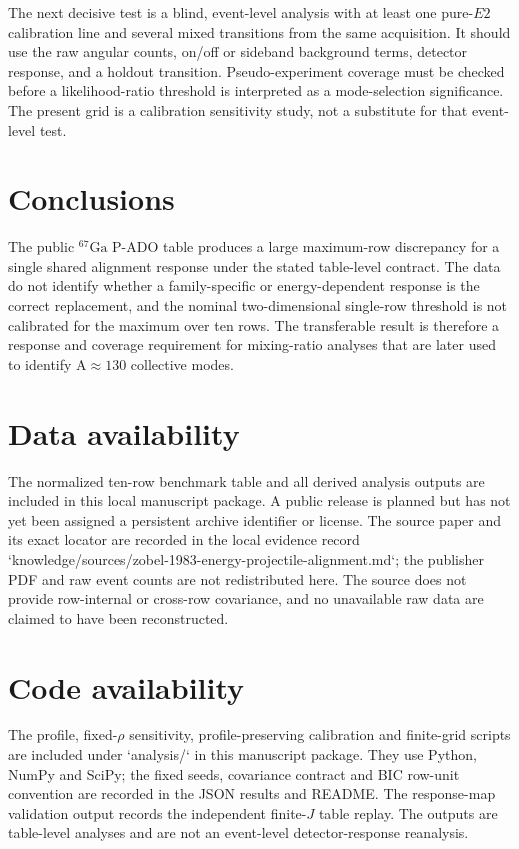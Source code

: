 \documentclass[pdflatex,iicol,sn-mathphys-num]{sn-jnl}
\begin{document}
The next decisive test is a blind, event-level analysis with at least one pure-\(E2\) calibration line and several mixed transitions from the same acquisition. It should use the raw angular counts, on/off or sideband background terms, detector response, and a holdout transition. Pseudo-experiment coverage must be checked before a likelihood-ratio threshold is interpreted as a mode-selection significance. The present grid is a calibration sensitivity study, not a substitute for that event-level test.

\section{Conclusions}

The public \(^{67}\mathrm{Ga}\) P-ADO table produces a large maximum-row
discrepancy for a single shared alignment response under the stated table-level
contract. The data do not identify whether a family-specific or energy-dependent
response is the correct replacement, and the nominal two-dimensional single-row
threshold is not calibrated for the maximum over ten rows. The transferable
result is therefore a response and coverage requirement for mixing-ratio
analyses that are later used to identify A\(\approx130\) collective modes.

\section*{Data availability}

The normalized ten-row benchmark table and all derived analysis outputs are included in
this local manuscript package. A public release is planned but has not yet been
assigned a persistent archive identifier or license. The source paper and its exact
locator are recorded in the local
evidence record `knowledge/sources/zobel-1983-energy-projectile-alignment.md`; the
publisher PDF and raw event counts are not redistributed here. The source does not
provide row-internal or cross-row covariance, and no unavailable raw data are
claimed to have been reconstructed.

\section*{Code availability}

The profile, fixed-\(\rho\) sensitivity, profile-preserving calibration and finite-grid
scripts are included under `analysis/` in this manuscript package. They use Python,
NumPy and SciPy; the fixed seeds, covariance contract and BIC row-unit convention
are recorded in the JSON results and README. The response-map validation output
records the independent finite-\(J\) table replay. The outputs are table-level
analyses and are not an event-level detector-response reanalysis.
\end{document}
